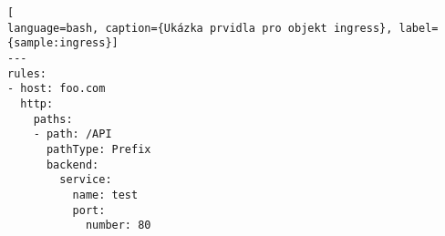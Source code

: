 \begin{lstfloat}
\begin{lstlisting}[
language=bash, caption={Ukázka prvidla pro objekt ingress}, label={sample:ingress}]
---
rules:
- host: foo.com
  http:
    paths:
    - path: /API
      pathType: Prefix
      backend:
        service:
          name: test
          port: 
            number: 80
\end{lstlisting}
\end{lstfloat}